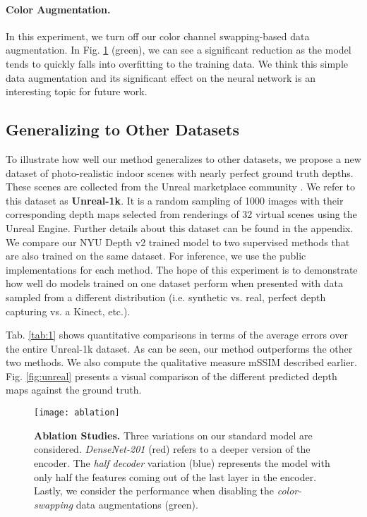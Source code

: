 \documentclass[10pt,twocolumn,letterpaper]{article}
\begin{document}
\paragraph{Color Augmentation.} In this experiment, we turn off our color channel swapping-based data augmentation. In Fig. \ref{fig:ablation} (green), we can see a significant reduction as the model tends to quickly falls into overfitting to the training data. We think this simple data augmentation and its significant effect on the neural network is an interesting topic for future work.



\subsection{Generalizing to Other Datasets}

To illustrate how well our method generalizes to other datasets, we propose a new dataset of photo-realistic indoor scenes with nearly perfect ground truth depths. These scenes are collected from the Unreal marketplace community \cite{UnrealMarket2018}. We refer to this dataset as \textbf{Unreal-1k}. It is a random sampling of 1000 images with their corresponding depth maps  selected from renderings of 32 virtual scenes using the Unreal Engine. Further details about this dataset can be found in the appendix. We compare our NYU Depth v2 trained model to two supervised methods that are also trained on the same dataset. For inference, we use the public implementations for each method. The hope of this experiment is to demonstrate how well do models trained on one dataset perform when presented with data sampled from a different distribution (i.e. synthetic vs. real, perfect depth capturing vs. a Kinect, etc.).

Tab. \ref{tab:1} shows quantitative comparisons in terms of the average errors over the entire Unreal-1k dataset. As can be seen, our method outperforms the other two methods. We also compute the qualitative measure mSSIM described earlier. Fig. \ref{fig:unreal} presents a visual comparison of the different predicted depth maps against the ground truth.




\begin{figure}
\begin{center}
\texttt{[image: ablation]}
\end{center}
   \caption{\textbf{Ablation Studies.} Three variations on our standard model are considered. \emph{DenseNet-201} (red) refers to a deeper version of the encoder. The \emph{half decoder} variation (blue) represents the model with only half the features coming out of the last layer in the encoder. Lastly, we consider the performance when disabling the \emph{color-swapping} data augmentations (green). }
\label{fig:ablation}
\end{figure}
\end{document}
